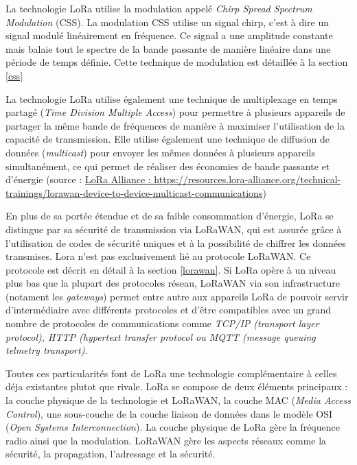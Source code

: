 \vspace{0.1cm}

La technologie LoRa utilise la modulation appelé \textit{Chirp Spread Spectrum Modulation} (CSS). La modulation CSS utilise un signal chirp, c'est à dire un signal modulé linéairement en fréquence. Ce signal a une amplitude constante mais balaie tout le spectre de la bande passante de manière linéaire dans une période de temps définie. Cette technique de modulation est détaillée à la section \ref{css}

\vspace{0.1cm}

La technologie LoRa utilise également une technique de multiplexage en temps partagé (\textit{Time Division Multiple Access}) pour permettre à plusieurs appareils de partager la même bande de fréquences de manière à maximiser l'utilisation de la capacité de transmission. Elle utilise également une technique de diffusion de données (\textit{multicast}) pour envoyer les mêmes données à plusieurs appareils simultanément, ce qui permet de réaliser des économies de bande passante et d'énergie (source : \href{https://resources.lora-alliance.org/technical-trainings/lorawan-device-to-device-multicast-communications}{LoRa Alliance : https://resources.lora-alliance.org/technical-trainings/lorawan-device-to-device-multicast-communications})

\vspace{0.1cm}

En plus de sa portée étendue et de sa faible consommation d'énergie, LoRa se distingue par sa sécurité de transmission via LoRaWAN, qui est assurée grâce à l'utilisation de codes de sécurité uniques et à la possibilité de chiffrer les données transmises. Lora n'est pas exclusivement lié au protocole LoRaWAN. Ce protocole est décrit en détail à la section \ref{lorawan}. Si LoRa opère à un niveau plus bas que la plupart des protocoles réseau, LoRaWAN via son infrastructure (notament les \textit{gateways}) permet entre autre aux appareils LoRa de pouvoir servir d'intermédiaire avec différents protocoles et d'être compatibles avec un grand nombre de protocoles de communications comme \textit{TCP/IP (transport layer protocol), HTTP (hypertext transfer protocol ou MQTT (message queuing telmetry transport)}.

\vspace{0.1cm}

Toutes ces  particularités font de LoRa une technologie complémentaire à celles déja existantes plutot que rivale.
LoRa se compose de deux éléments principaux : la couche physique de la technologie et LoRaWAN, la couche MAC (\textit{Media Access Control}), une sous-couche de la couche liaison de données dans le modèle OSI (\textit{Open Systems Interconnection}). La couche physique de LoRa gère la fréquence radio ainsi que la modulation. LoRaWAN gère les aspects réseaux comme la sécurité, la propagation, l'adressage et la sécurité.

